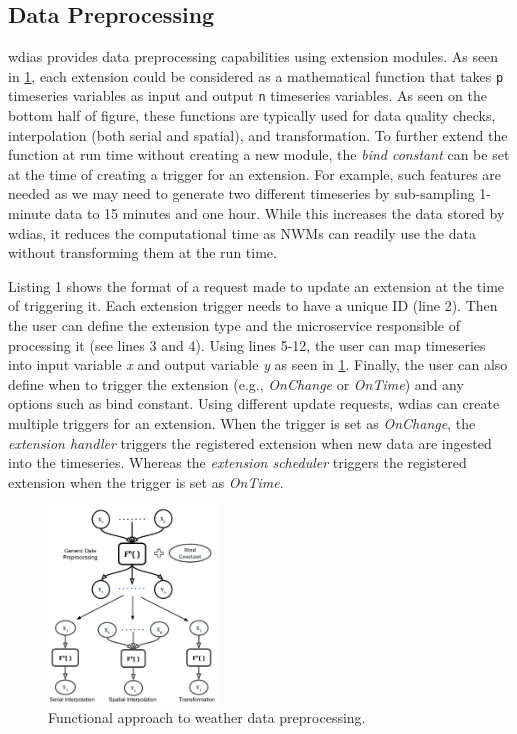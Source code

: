 \documentclass[conference]{IEEEtran}
\begin{document}
\subsection{Data Preprocessing}
\label{psubse:data_preprocessing}

\acrshort{wdias} provides data preprocessing capabilities using extension modules. As seen in \cref{pfi:summary_weather_data_preprocessing}, each extension could be considered as a mathematical function that takes \texttt{p} timeseries variables as input and output \texttt{n} timeseries variables. As seen on the bottom half of figure, these functions are typically used for data quality checks, interpolation (both serial and spatial), and transformation. To further extend the function at run time without creating a new module, the \textit{bind constant} can be set at the time of creating a trigger for an extension. For example, such features are needed as we may need to generate two different timeseries by sub-sampling 1-minute data to 15 minutes and one hour. While this increases the data stored by \acrshort{wdias}, it reduces the computational time as NWMs can readily use the data without transforming them at the run time. 

Listing 1 shows the format of a request made to update an extension at the time of triggering it. Each extension trigger needs to have a unique ID (line 2). Then the user can define the extension type and the microservice responsible of processing it (see lines 3 and 4). Using lines 5-12, the user can map timeseries into input variable \emph{x} and output variable \emph{y} as seen in \cref{pfi:summary_weather_data_preprocessing}. Finally, the user can also define when to trigger the extension (e.g., \textit{OnChange} or \textit{OnTime}) and any options such as bind constant. Using different update requests, \acrshort{wdias} can create multiple triggers for an extension. When the trigger is set as \emph{OnChange}, the \emph{extension handler} triggers the registered extension when new data are ingested into the timeseries. Whereas the \emph{extension scheduler} triggers the registered extension when the trigger is set as \emph{OnTime}. 


\begin{figure}[!tb]
\centerline{\includegraphics[width=0.4\textwidth]{images/summary_weather_data_preprocessing_p1.pdf}}
\caption{Functional approach to weather data preprocessing.}
\label{pfi:summary_weather_data_preprocessing}
\end{figure}
\end{document}
